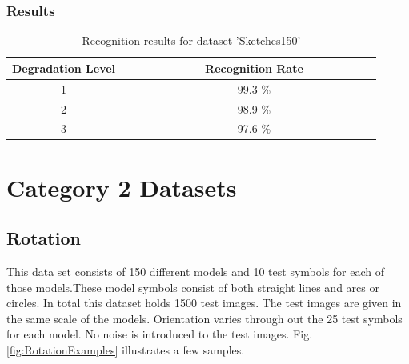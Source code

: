 \subsubsection{Results}
\begin{table}[H]
\centering
\caption{Recognition results for dataset 'Sketches150'}
\begin{tabular}{ccccccccccccccc}
  \hline
      Degradation Level & & & & & & & & Recognition Rate \\
  \hline
     1 & & & & & & & &  99.3 \% \\
     2 & & & & & & & &  98.9 \% \\
     3 & & & & & & & &  97.6 \% \\

  \hline
\end{tabular}
\end{table}
\vspace{49.3mm}


\section {Category 2 Datasets}
\subsection{Rotation}
This data set consists of 150 different models and 10 test symbols for each of those models.These model symbols consist of both straight lines and arcs or circles. In total this dataset holds 1500 test images. The test images are given in the same scale of the models. Orientation varies through out the 25 test symbols for each model. No noise is introduced to the test images. Fig. \ref{fig:RotationExamples} illustrates a few samples.


